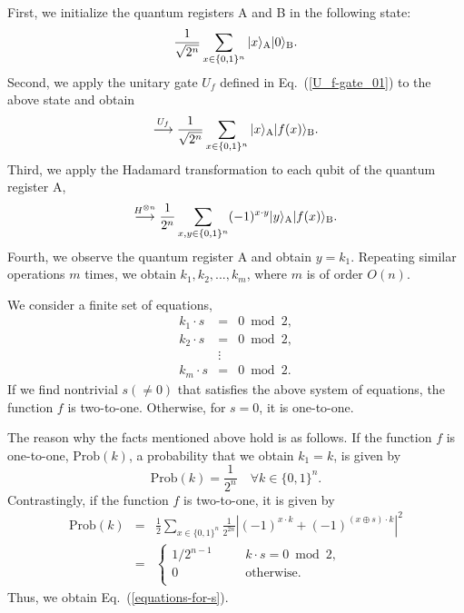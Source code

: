 \documentclass[12pt]{article}
\begin{document}
First,
we initialize the quantum registers A and B in the following state:
\begin{equation}
\frac{1}{\sqrt{2^{n}}}
\sum_{x\in\{0,1\}^{n}}
|x\rangle_{\mbox{\scriptsize A}}
|0\rangle_{\mbox{\scriptsize B}}.
\label{initial-state-Simon-0}
\end{equation}
Second,
we apply the unitary gate $U_{f}$ defined in Eq.~(\ref{U_f-gate_01}) to the above state and obtain
\begin{equation}
\stackrel{U_{f}}{\longrightarrow}
\frac{1}{\sqrt{2^{n}}}
\sum_{x\in\{0,1\}^{n}}
|x\rangle_{\mbox{\scriptsize A}}
|f(x)\rangle_{\mbox{\scriptsize B}}.
\end{equation}
Third,
we apply the Hadamard transformation to each qubit of the quantum register A,
\begin{equation}
\stackrel{H^{\otimes n}}{\longrightarrow}
\frac{1}{2^{n}}
\sum_{x,y\in\{0,1\}^{n}}
(-1)^{x\cdot y}
|y\rangle_{\mbox{\scriptsize A}}
|f(x)\rangle_{\mbox{\scriptsize B}}.
\end{equation}
Fourth,
we observe the quantum register A and obtain $y=k_{1}$.
Repeating similar operations $m$ times,
we obtain $k_{1},k_{2}, ..., k_{m}$,
where $m$ is of order $O(n)$.

We consider a finite set of equations,
\begin{eqnarray}
k_{1}\cdot s
&=&
0 \bmod 2, \nonumber \\
k_{2}\cdot s
&=&
0 \bmod 2, \nonumber \\
&\vdots& \nonumber \\
k_{m}\cdot s
&=&
0 \bmod 2.
\label{equations-for-s}
\end{eqnarray}
If we find nontrivial $s(\neq 0)$ that satisfies the above system of equations,
the function $f$ is two-to-one.
Otherwise,
for $s=0$,
it is one-to-one.

The reason why the facts mentioned above hold is as follows.
If the function $f$ is one-to-one,
$\mbox{Prob}(k)$,
a probability that we obtain $k_{1}=k$,
is given by
\begin{equation}
\mbox{Prob}(k)
=
\frac{1}{2^{n}}
\quad
\forall k\in\{0,1\}^{n}.
\end{equation}
Contrastingly,
if the function $f$ is two-to-one,
it is given by
\begin{eqnarray}
\mbox{Prob}(k)
&=&
\frac{1}{2}
\sum_{x\in\{0,1\}^{n}}
\frac{1}{2^{2n}}
|
(-1)^{x\cdot k}
+
(-1)^{(x\oplus s)\cdot k}
|^{2} \nonumber \\
&=&
\left\{
\begin{array}{lll}
1/2^{n-1} & \quad & k\cdot s=0 \bmod 2, \\
0         & \quad & \mbox{otherwise.} \\
\end{array}
\right.
\end{eqnarray}
Thus,
we obtain Eq.~(\ref{equations-for-s}).
\end{document}
